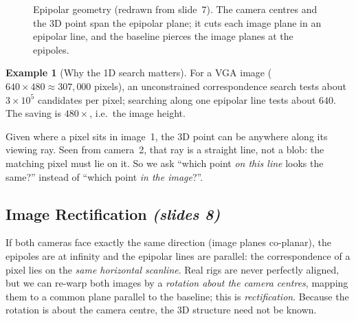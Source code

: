 \documentclass[11pt,a4paper]{article}
\newcommand{\slr}[1]{\texorpdfstring{\emph{(slides #1)}}{(slides #1)}}
\theoremstyle{definition}
\newtheorem{example}[definition]{Example}
\theoremstyle{plain}
\theoremstyle{remark}
\begin{document}
\begin{figure}[H]\centering
{}
\caption{Epipolar geometry (redrawn from slide~7). The camera centres and the 3D point span the epipolar plane; it cuts each image plane in an epipolar line, and the baseline pierces the image planes at the epipoles.}
\end{figure}

\begin{example}[Why the 1D search matters]
For a VGA image ($640\times480\approx 307{,}000$ pixels), an unconstrained correspondence search tests about $3\times10^5$ candidates per pixel; searching along one epipolar line tests about $640$. The saving is $480\times$, i.e.\ the image height.
\end{example}
\begin{intuition}
Given where a pixel sits in image~1, the 3D point can be anywhere along its viewing ray. Seen from camera~2, that ray is a straight line, not a blob: the matching pixel must lie on it. So we ask ``which point \emph{on this line} looks the same?'' instead of ``which point \emph{in the image}?''.
\end{intuition}

\subsection{Image Rectification \slr{8}}
If both cameras face exactly the same direction (image planes co-planar), the epipoles are at infinity and the epipolar lines are parallel: the correspondence of a pixel lies on the \emph{same horizontal scanline}. Real rigs are never perfectly aligned, but we can re-warp both images by a \emph{rotation about the camera centres}, mapping them to a common plane parallel to the baseline; this is \emph{rectification}. Because the rotation is about the camera centre, the 3D structure need not be known.
\end{document}
